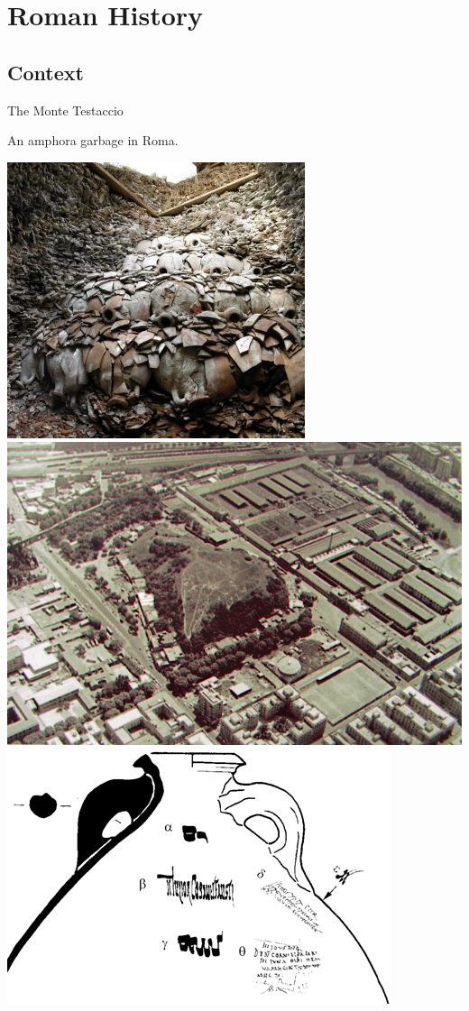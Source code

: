 \documentclass[8pt, handout=show,notes=show]{beamer}
\begin{document}
\section{Roman History}
\subsection{Context}

\begin{frame}{The Monte Testaccio}

	An amphora garbage in Roma.\\

	\begin{center}
		\includegraphics[height=0.3\textwidth]{images/Mount-Testaccio.jpg}
		\hfil \includegraphics[height=0.3\textwidth]{images/Mount-Testaccio2.jpg}\\
		\vfill
		\includegraphics[height=0.3\textwidth]{images/titulus.png}

	\end{center}

\end{frame}
\end{document}
